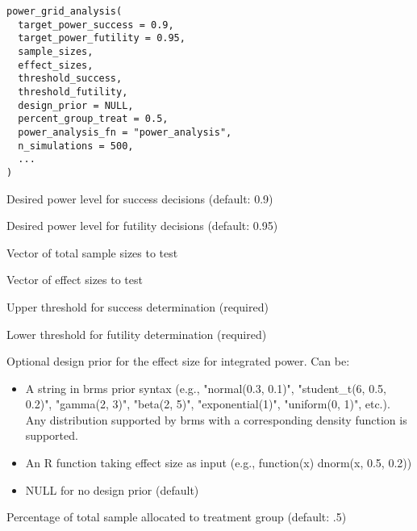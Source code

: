 \documentclass[letterpaper]{book}
\begin{document}
%
\begin{Usage}
\begin{verbatim}
power_grid_analysis(
  target_power_success = 0.9,
  target_power_futility = 0.95,
  sample_sizes,
  effect_sizes,
  threshold_success,
  threshold_futility,
  design_prior = NULL,
  percent_group_treat = 0.5,
  power_analysis_fn = "power_analysis",
  n_simulations = 500,
  ...
)
\end{verbatim}
\end{Usage}
%
\begin{Arguments}
\begin{ldescription}
\item[\code{target\_power\_success}] Desired power level for success decisions (default: 0.9)

\item[\code{target\_power\_futility}] Desired power level for futility decisions (default: 0.95)

\item[\code{sample\_sizes}] Vector of total sample sizes to test

\item[\code{effect\_sizes}] Vector of effect sizes to test

\item[\code{threshold\_success}] Upper threshold for success determination (required)

\item[\code{threshold\_futility}] Lower threshold for futility determination (required)

\item[\code{design\_prior}] Optional design prior for the effect size for integrated power. Can be:
\begin{itemize}

\item{} A string in brms prior syntax (e.g., "normal(0.3, 0.1)", "student\_t(6, 0.5, 0.2)", "gamma(2, 3)", "beta(2, 5)", "exponential(1)", "uniform(0, 1)", etc.). Any distribution supported by brms with a corresponding density function is supported.
\item{} An R function taking effect size as input (e.g., function(x) dnorm(x, 0.5, 0.2))
\item{} NULL for no design prior (default)

\end{itemize}


\item[\code{percent\_group\_treat}] Percentage of total sample allocated to treatment group (default: .5)


\end{ldescription}
\end{Arguments}
\end{document}

